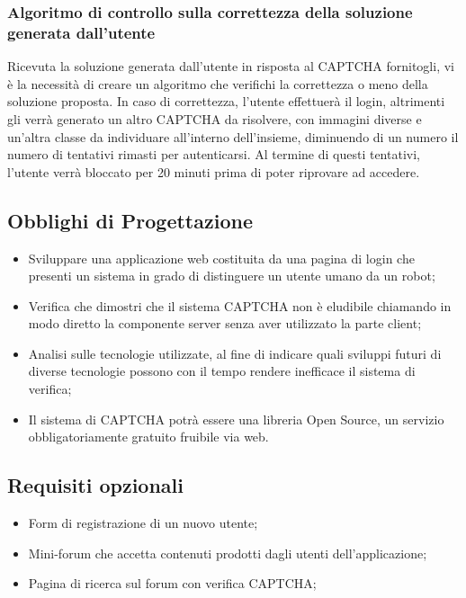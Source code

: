 \subsubsection{Algoritmo di controllo sulla correttezza della soluzione generata dall'utente}
Ricevuta la soluzione generata dall'utente in risposta al CAPTCHA fornitogli, vi è la necessità di creare un algoritmo che verifichi la correttezza o meno della soluzione proposta. In caso di correttezza, l'utente effettuerà il login, altrimenti gli verrà generato un altro CAPTCHA da risolvere, con immagini diverse e un'altra classe da individuare all'interno dell'insieme, diminuendo di un numero il numero di tentativi rimasti per autenticarsi. Al termine di questi tentativi, l'utente verrà bloccato per 20 minuti prima di poter riprovare ad accedere. 

\subsection{Obblighi di Progettazione}
\begin{itemize}
    \item Sviluppare una applicazione web costituita da una pagina di login che presenti un sistema in grado di distinguere un utente umano da un robot;
    \item Verifica che dimostri che il sistema CAPTCHA non è eludibile chiamando in modo diretto la componente server senza aver utilizzato la parte client;
    \item Analisi sulle tecnologie utilizzate, al fine di indicare quali sviluppi futuri di diverse tecnologie possono con il tempo rendere inefficace il sistema di verifica;
    \item Il sistema di CAPTCHA potrà essere una libreria Open Source, un servizio obbligatoriamente gratuito fruibile via web.
\end{itemize}

\subsection{Requisiti opzionali}
\begin{itemize}
    \item Form di registrazione di un nuovo utente;
    \item Mini-forum che accetta contenuti prodotti dagli utenti dell'applicazione;
    \item Pagina di ricerca sul forum con verifica CAPTCHA;
\end{itemize}

